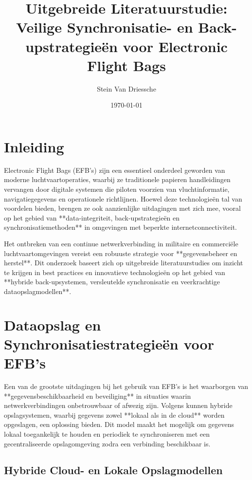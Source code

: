\documentclass{hogent-article}
\title{Uitgebreide Literatuurstudie: Veilige Synchronisatie- en Back-upstrategieën voor Electronic Flight Bags}
\author{Stein Van Driessche}
\date{\today}
\begin{document}
        
        \maketitle
        
        \section{Inleiding}
        
        Electronic Flight Bags (EFB’s) zijn een essentieel onderdeel geworden van moderne luchtvaartoperaties, waarbij ze traditionele papieren handleidingen vervangen door digitale systemen die piloten voorzien van vluchtinformatie, navigatiegegevens en operationele richtlijnen. Hoewel deze technologieën tal van voordelen bieden, brengen ze ook aanzienlijke uitdagingen met zich mee, vooral op het gebied van **data-integriteit, back-upstrategieën en synchronisatiemethoden** in omgevingen met beperkte internetconnectiviteit.
        
        Het ontbreken van een continue netwerkverbinding in militaire en commerciële luchtvaartomgevingen vereist een robuuste strategie voor **gegevensbeheer en herstel**. Dit onderzoek baseert zich op uitgebreide literatuurstudies om inzicht te krijgen in best practices en innovatieve technologieën op het gebied van **hybride back-upsystemen, versleutelde synchronisatie en veerkrachtige dataopslagmodellen**.
        
        \section{Dataopslag en Synchronisatiestrategieën voor EFB’s}
        
        Een van de grootste uitdagingen bij het gebruik van EFB’s is het waarborgen van **gegevensbeschikbaarheid en beveiliging** in situaties waarin netwerkverbindingen onbetrouwbaar of afwezig zijn. Volgens \textcite{Yanamala2024} kunnen hybride opslagsystemen, waarbij gegevens zowel **lokaal als in de cloud** worden opgeslagen, een oplossing bieden. Dit model maakt het mogelijk om gegevens lokaal toegankelijk te houden en periodiek te synchroniseren met een gecentraliseerde opslagomgeving zodra een verbinding beschikbaar is.
        
        \subsection{Hybride Cloud- en Lokale Opslagmodellen}
        
\end{document}
